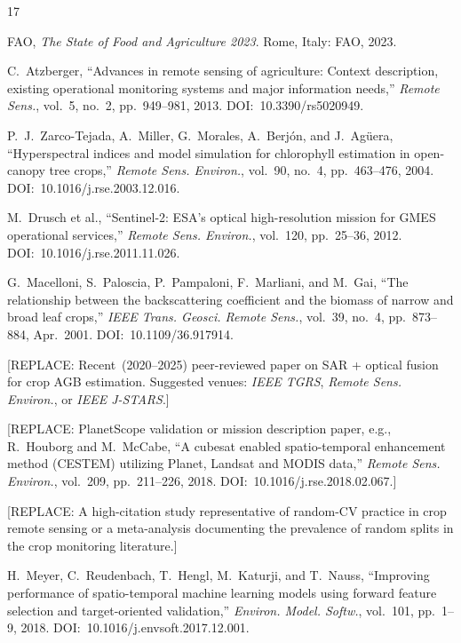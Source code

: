 \documentclass[lettersize,journal]{IEEEtran}
\begin{document}
\begin{thebibliography}{17}


FAO, \textit{The State of Food and Agriculture 2023}. Rome, Italy: FAO, 2023.

C.~Atzberger, ``Advances in remote sensing of agriculture: Context
description, existing operational monitoring systems and major information
needs,'' \textit{Remote Sens.}, vol.~5, no.~2, pp.~949--981, 2013.
DOI:~10.3390/rs5020949.

P.~J.~Zarco-Tejada, A.~Miller, G.~Morales, A.~Berjón, and J.~Agüera,
``Hyperspectral indices and model simulation for chlorophyll estimation in
open-canopy tree crops,'' \textit{Remote Sens. Environ.}, vol.~90, no.~4,
pp.~463--476, 2004. DOI:~10.1016/j.rse.2003.12.016.

M.~Drusch et al., ``Sentinel-2: ESA's optical high-resolution mission for
GMES operational services,'' \textit{Remote Sens. Environ.}, vol.~120,
pp.~25--36, 2012. DOI:~10.1016/j.rse.2011.11.026.

G.~Macelloni, S.~Paloscia, P.~Pampaloni, F.~Marliani, and M.~Gai,
``The relationship between the backscattering coefficient and the biomass of
narrow and broad leaf crops,'' \textit{IEEE Trans. Geosci. Remote Sens.},
vol.~39, no.~4, pp.~873--884, Apr.~2001. DOI:~10.1109/36.917914.

[REPLACE: Recent~(2020--2025) peer-reviewed paper on SAR + optical fusion
for crop AGB estimation. Suggested venues: \textit{IEEE TGRS},
\textit{Remote Sens. Environ.}, or \textit{IEEE J-STARS}.]

[REPLACE: PlanetScope validation or mission description paper,
e.g., R.~Houborg and M.~McCabe,
``A cubesat enabled spatio-temporal enhancement method (CESTEM) utilizing
Planet, Landsat and MODIS data,'' \textit{Remote Sens. Environ.},
vol.~209, pp.~211--226, 2018. DOI:~10.1016/j.rse.2018.02.067.]

[REPLACE: A high-citation study representative of random-CV practice in
crop remote sensing or a meta-analysis documenting the prevalence of
random splits in the crop monitoring literature.]

H.~Meyer, C.~Reudenbach, T.~Hengl, M.~Katurji, and T.~Nauss,
``Improving performance of spatio-temporal machine learning models using
forward feature selection and target-oriented validation,''
\textit{Environ. Model. Softw.}, vol.~101, pp.~1--9, 2018.
DOI:~10.1016/j.envsoft.2017.12.001.


\end{thebibliography}
\end{document}
